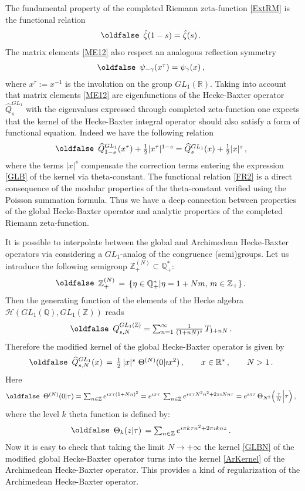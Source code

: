\documentclass[12pt]{article}
\def\IQ{\mathbb{Q}}
\def\IR{\mathbb{R}}
\def\IZ{\mathbb{Z}}
\def\CH {\mathcal{H}}
\def\wh{\widehat}
\def\be{\begin{eqnarray}\new\begin{array}{cc}}
\def\ee{\end{array}\end{eqnarray}}
\begin{document}
The fundamental property of the completed  Riemann zeta-function
\eqref{ExtRM} is the functional relation
\be\label{FR1}
\hat{\zeta}(1-s)=\hat{\zeta}(s)\,.
\ee
The  matrix elements \eqref{ME12} also respect an analogous
reflection symmetry
\be
\psi_{-\gamma}(x^{\tau})=\psi_\gamma(x)\,,
\ee
where $x^{\tau}:=x^{-1}$ is the involution on the group
$GL_1(\IR)$. Taking into account that matrix elements \eqref{ME12} are
eigenfunctions of the Hecke-Baxter operator $\hat{Q}_s^{GL_1}$ with
the eigenvalues expressed through completed zeta-function  one
expects that the kernel of the Hecke-Baxter integral operator
should also  satisfy a form of functional equation. Indeed we have the
following relation
\be\label{FR2}
\wh{Q}^{GL_1}_{1-s}(x^\tau)+\frac{1}{2}|x^\tau|^{1-s}=
\wh{Q}^{GL_1}_{s}(x)+\frac{1}{2}|x|^{s}\,,
\ee
where the terms $|x|^s$ compensate the correction terms
entering the expression \eqref{GLB} of the kernel via theta-constant.
The functional relation  \eqref{FR2} is a direct consequence of the
modular properties of the theta-constant verified using the Poisson
summation formula. Thus we have a deep connection between properties
of the global Hecke-Baxter  operator and analytic properties of the
completed  Riemann zeta-function.


It is possible to interpolate between the global and Archimedean Hecke-Baxter
operators via considering a $GL_1$-analog of the
congruence (semi)groups. Let us introduce
the following semigroup $\IZ_+^{(N)}\subset\IQ^*_+$:
 \be
  \IZ_+^{(N)}\,=\,\{\eta \in \IQ_+^*|\eta=1+Nm, \,m\in \IZ_+\}\,.
 \ee
Then the generating function of the elements of the Hecke
algebra $\CH(GL_1(\IQ),GL_1(\IZ))$ reads
 \be
  Q^{GL_1(\IZ)}_{s,N}=\sum_{n=1}^{\infty} \frac{1}{(1+nN)^s}\,T_{1+nN}\,.
 \ee
Therefore the  modified kernel of the global Hecke-Baxter operator is
given by
 \be\label{GLBN}
  \wh{Q}^{GL_1}_{s,N}(x)\,
  =\,\frac{1}{2}\,|x|^s\,\,\Theta^{(N)}(0|\imath x^2)\,,\qquad x\in
  \IR^*\,,\qquad N>1\,.
 \ee
Here
\be
\Theta^{(N)}(0|\tau)=\sum_{n\in \IZ} e^{\imath \pi \tau (1+Nn)^2}=
e^{\imath \pi \tau }\,
\sum_{n\in \IZ} e^{\imath \pi \tau N^2n^2+2\pi \imath Nn\tau}=
e^{\imath \pi \tau }\,\Theta_{N^2}\Big(\frac{\tau}{N}\Big|\tau\Big)\,,
\ee
where the level $k$ theta function is defined by:
 \be
  \Theta_k(z|\tau)\,
  =\sum_{n\in \IZ} e^{\imath \pi k\tau n^2+2\pi \imath knz}\,.
 \ee
Now it is easy to check that taking the limit $N\to+\infty$ the kernel \eqref{GLBN}
of the modified global Hecke-Baxter operator   turns into the kernel
\eqref{ArKernel} of the Archimedean Hecke-Baxter operator.  This
provides a kind of regularization of the Archimedean  Hecke-Baxter
operator.
\end{document}

